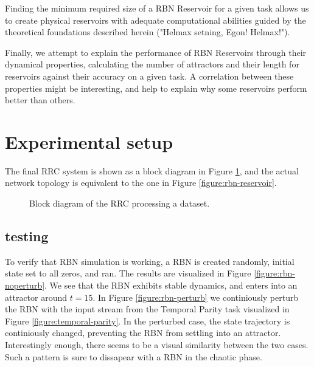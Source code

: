 Finding the minimum required size of a RBN Reservoir for a given task allows us to create physical reservoirs with adequate computational abilities guided by the theoretical foundations described herein ("Helmax setning, Egon! Helmax!").

Finally, we attempt to explain the performance of RBN Reservoirs through their dynamical properties,
calculating the number of attractors and their length for reservoirs against their accuracy on a given task.
A correlation between these properties might be interesting, and help to explain why some reservoirs perform better than others.

\section{Experimental setup}

The final RRC system is shown as a block diagram in Figure \ref{figure:rrc-block},
and the actual network topology is equivalent to the one in Figure \ref{figure:rbn-reservoir}.


\begin{figure}
  \centering
  \caption{Block diagram of the RRC processing a dataset.}
  \label{figure:rrc-block}
\end{figure}

\subsection{testing}

To verify that RBN simulation is working,
a RBN is created randomly, initial state set to all zeros, and ran.
The results are visualized in Figure \ref{figure:rbn-noperturb}.
We see that the RBN exhibits stable dynamics, and enters into an attractor around $t=15$.
In Figure \ref{figure:rbn-perturb} we continiously perturb the RBN with the input stream from the Temporal Parity task visualized in Figure \ref{figure:temporal-parity}.
In the perturbed case, the state trajectory is continiously changed, preventing the RBN from settling into an attractor.
Interestingly enough, there seems to be a visual similarity between the two cases.
Such a pattern is sure to dissapear with a RBN in the chaotic phase.

